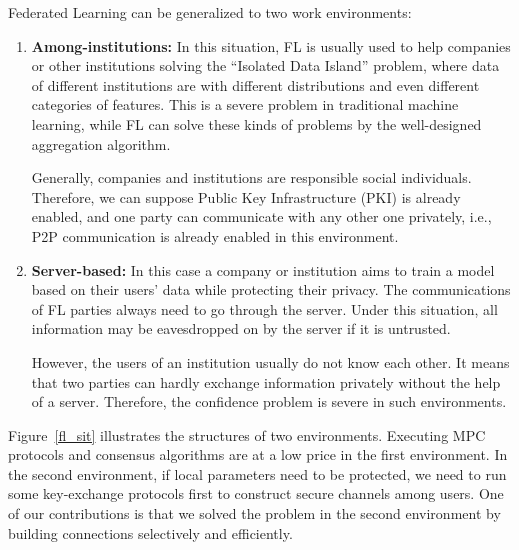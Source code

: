Federated Learning can be generalized to two work environments:

\begin{enumerate}

    \item \textbf{Among-institutions:} In this situation, FL is usually used to help companies or other institutions solving the ``Isolated Data Island'' problem, where data of different institutions are with different distributions and even different categories of features. This is a severe problem in traditional machine learning, while FL can solve these kinds of problems by the well-designed aggregation algorithm. 

    Generally, companies and institutions are responsible social individuals. Therefore, we can suppose Public Key Infrastructure (PKI) is already enabled, and one party can communicate with any other one privately, i.e., P2P communication is already enabled in this environment.

    \item \textbf{Server-based:} In this case a company or institution aims to train a model based on their users' data while protecting their privacy. The communications of FL parties always need to go through the server. Under this situation, all information may be eavesdropped on by the server if it is untrusted. 

    However, the users of an institution usually do not know each other. It means that two parties can hardly exchange information privately without the help of a server. Therefore, the confidence problem is severe in such environments.

\end{enumerate}

Figure~\ref{fl_sit} illustrates the structures of two environments. Executing MPC protocols and consensus algorithms are at a low price in the first environment. In the second environment, if local parameters need to be protected, we need to run some key-exchange protocols first to construct secure channels among users. One of our contributions is that we solved the problem in the second environment by building connections selectively and efficiently.

